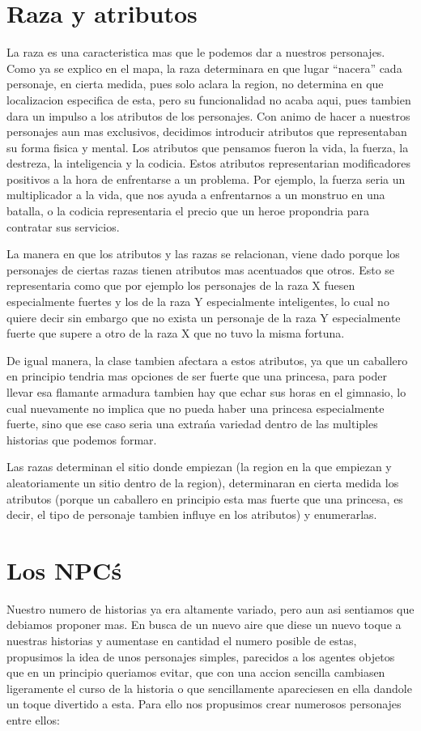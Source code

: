 \section{Raza y atributos}

La raza es una caracteristica mas que le podemos dar a nuestros personajes.
Como ya se explico en el mapa, la raza determinara en que lugar “nacera” cada personaje, en cierta medida, pues solo aclara la region, no determina en que localizacion especifica de esta, pero su funcionalidad no acaba aqui, pues tambien dara un impulso a los atributos de los personajes.
Con animo de hacer a nuestros personajes aun mas exclusivos, decidimos introducir atributos que representaban su forma fisica y mental. Los atributos que pensamos fueron la vida, la fuerza, la destreza, la inteligencia y la codicia.
Estos atributos representarian modificadores positivos a la hora de enfrentarse a un problema. Por ejemplo, la fuerza seria un multiplicador a la vida, que nos ayuda a enfrentarnos a un monstruo en una batalla, o la codicia representaria el precio que un heroe propondria para contratar sus servicios.

La manera en que los atributos y las razas se relacionan, viene dado porque los personajes de ciertas razas tienen atributos mas acentuados que otros. Esto se representaria como que por ejemplo los personajes de la raza X fuesen especialmente fuertes y los de la raza Y especialmente inteligentes, lo cual no quiere decir sin embargo que no exista un personaje de la raza Y especialmente fuerte que supere a otro de la raza X que no tuvo la misma fortuna.

De igual manera, la clase tambien afectara a estos atributos, ya que un caballero en principio tendria mas opciones de ser fuerte que una princesa, para poder llevar esa flamante armadura tambien hay que echar sus horas en el gimnasio, lo cual nuevamente no implica que no pueda haber una princesa especialmente fuerte, sino que ese caso seria una extra\'na variedad dentro de las multiples historias que podemos formar.

Las razas determinan el sitio donde empiezan (la region en la que empiezan y aleatoriamente un sitio dentro de la region), determinaran en cierta medida los atributos (porque un caballero en principio esta mas fuerte que una princesa, es decir, el tipo de personaje tambien influye en los atributos) y enumerarlas.

\section{Los NPC\'s}
Nuestro numero de historias ya era altamente variado, pero aun asi sentiamos que debiamos proponer mas. En busca de un nuevo aire que diese un nuevo toque a nuestras historias y aumentase en cantidad el numero posible de estas, propusimos la idea de unos personajes simples, parecidos a los agentes objetos que en un principio queriamos evitar, que con una accion sencilla cambiasen ligeramente el curso de la historia o que sencillamente apareciesen en ella dandole un toque divertido a esta.
Para ello nos propusimos crear numerosos personajes entre ellos:

